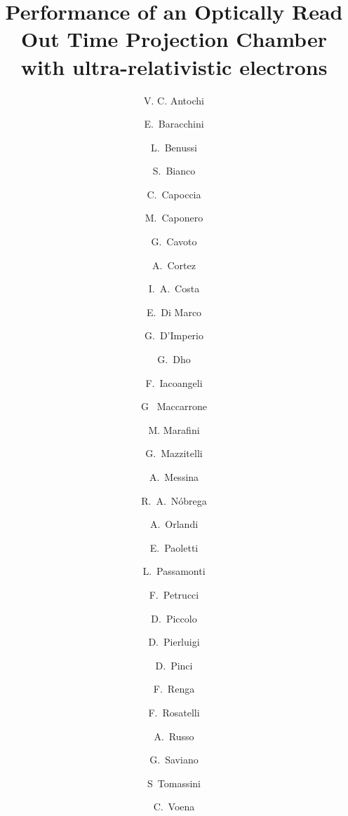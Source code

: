 \documentclass[review]{elsarticle}
\begin{document}

%
%


\begin{frontmatter}


\title{Performance of an Optically Read Out Time Projection Chamber with ultra-relativistic electrons}

% 
\author[a1,a2]{V. C. Antochi}
\author[a3]{E.~Baracchini}
\author[a4]{L.~Benussi}
\author[a4]{S.~Bianco}
\author[a4]{C.~Capoccia}
\author[a5,a4]{M.~Caponero}
\author[a1,a7]{G.~Cavoto}
\author[a3]{A.~Cortez}
\author[a1,a6]{I.~A.~Costa}
\author[a7]{E.~Di Marco}
\author[a7]{G.~D'Imperio}
\author[a3]{G.~Dho}
\author[a7]{F.~Iacoangeli}
\author[a4]{G~ Maccarrone}
\author[a8,a7]{M. Marafini}
\author[a4]{G.~Mazzitelli}
\author[a1,a7]{A.~Messina}
\author[a6]{R.~A.~Nóbrega}
\author[a4]{A.~Orlandi}
\author[a4]{E.~Paoletti}
\author[a4]{L.~Passamonti}
\author[a9,a10]{F.~Petrucci}
\author[a4]{D.~Piccolo}
\author[a4]{D.~Pierluigi}
\author[a7]{D.~Pinci}
\author[a7]{F.~Renga}
\author[a4]{F.~Rosatelli}
\author[a4]{A.~Russo}
\author[a11,a4]{G.~Saviano}
\author[a4]{S~Tomassini}
\author[a7]{C.~Voena}

\address[a1]{Dipartimento di Fisica, Sapienza Universit\`a di Roma, Rome I-00185, Italy}
\address[a2]{now at Oskar Klein Centre, Department of Physics, Stockholm University, AlbaNova, Stockholm SE-10691, Sweden}
\address[a3]{Gran~Sasso~Science~Institute, L'Aquila I-67100, Italy}
\address[a4]{Istituto Nazionale di Fisica Nucleare, Laboratori Nazionali di Frascati, I-00040, Italy}
\address[a5]{ENEA Centro Ricerche Frascati, Frascati (Rome) I-00044, Italy}
\address[a6]{Universidade Federal de Juiz de Fora, Juiz de Fora 36000-000, MG, Brazil}
\address[a7]{Istituto~Nazionale~di~Fisica~Nucleare~Sezione di Roma, Rome I-00185, Italy}
\address[a8]{Museo Storico della Fisica e Centro Studi e Ricerche "Enrico Fermi" Piazza del Viminale 1, Rome I-00184, Italy}
\address[a9]{Istituto Nazionale di Fisica Nucleare, Sezione di Roma TRE, Rome I-00146, Italy}
\address[a10]{Dipartimento di Matematica e Fisica, Universit\`a Roma TRE, Rome I-00146, Italy}
\address[a11]{Dipartimento di Ingegneria Chimica, Materiali e Ambiente, Sapienza Universit\`a di Roma, Rome I-00185, Italy}


\end{frontmatter}
\end{document}
